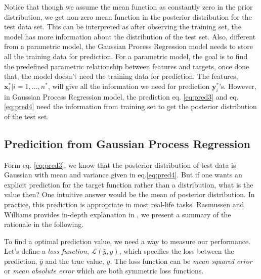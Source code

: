 \documentclass[11pt,a4paper]{article}
\theoremstyle{definition}
\numberwithin{equation}{section}
\let\vec\mathbf
\begin{document}
	Notice that though we assume the mean function as constantly zero in the prior distribution, we get non-zero mean function in the posterior distribution for the test data set. This can be interpreted as after observing the training set, the model has more information about the distribution of the test set. Also, different from a parametric model, the Gaussian Process Regression model needs to store all the training data for prediction. For a parametric model, the goal is to find the predefined parametric relationship between features and targets, once done that, the model doesn't need the training data for prediction. The features, ${\vec x^*_i | i=1,...,n^*}$, will give all the information we need for prediction $\vec y^*_i$'s. However, in Gaussian Process Regression model, the prediction eq. \ref{eq:pred3} and eq. \ref{eq:pred4} need the information from training set to get the posterior distribution of the test set.
	
	\subsection{Predicition from Gaussian Process Regression}\label{sec:decision_theory}
	Form eq. \ref{eq:pred3}, we know that the posterior distribution of test data is Gaussian with mean and variance given in eq.\ref{eq:pred4}. But if one wants an explicit prediction for the target function rather than a distribution, what is the value then? One intuitive answer would be the mean of posterior distribution. In practice, this prediction is appropriate in most real-life tasks. Rasmussen and Williams provides in-depth explanation in \cite[sec 2.4]{RandW}, we present a summary of the rationale in the following.
	
	To find a optimal prediction value, we need a way to measure our performance. Let's define a \textit{loss function}, $\mathcal{L}(\hat y,y)$, which specifies the loss between the prediction, $\hat y$ and the true value, $y$. The loss function can be \textit{mean squared error} or \textit{mean absolute error} which are both symmetric loss functions.
	
\end{document}
